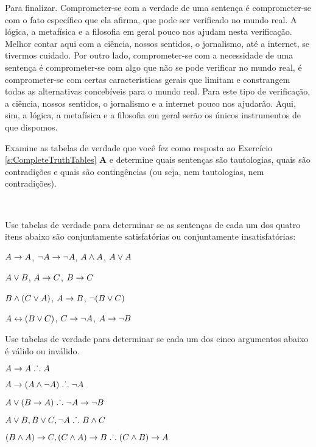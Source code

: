 Para finalizar.
Comprometer-se com a verdade de uma sentença é comprometer-se com o fato específico que ela afirma, que pode ser verificado no mundo real.
A lógica, a metafísica e a filosofia em geral pouco nos ajudam nesta verificação.
Melhor contar aqui com a ciência, nossos sentidos, o jornalismo, até a internet, se tivermos cuidado.
Por outro lado, comprometer-se com a necessidade de uma sentença é comprometer-se com algo que não se pode verificar no mundo real, é comprometer-se com certas características gerais que limitam e constrangem todas as alternativas concebíveis para o mundo real.
Para este tipo de verificação, a ciência, nossos sentidos, o jornalismo e a internet pouco nos ajudarão.
Aqui, sim, a lógica, a metafísica e a filosofia em geral serão os únicos instrumentos de que dispomos.


\practiceproblems
\problempart
Examine as tabelas de verdade que você fez como resposta ao Exercício \ref{s:CompleteTruthTables} \textbf{A} e determine quais sentenças são tautologias, quais são contradições e quais são contingências (ou seja, nem tautologias, nem contradições).
\solutions

\

\problempart
\label{pr.TT.satisfiable}
Use tabelas de verdade para determinar se as sentenças de cada um dos quatro itens abaixo são conjuntamente satisfatórias ou conjuntamente insatisfatórias:
\begin{earg}
\item $A\rightarrow A$, $\neg A \rightarrow \neg A$, $A\wedge A$, $A\vee A$ %
\item $A\vee B$, $A\rightarrow C$, $B\rightarrow C$ %
\item $B\wedge(C\vee A)$, $A\rightarrow B$, $\neg(B\vee C)$  %
\item $A\leftrightarrow(B\vee C)$, $C\rightarrow \neg A$, $A\rightarrow \neg B$ %
\end{earg}


\solutions
\problempart
\label{pr.TT.valid}
Use tabelas de verdade para determinar se cada um dos cinco argumentos abaixo é válido ou inválido.
\begin{earg}
\item $A\rightarrow A \mathrel{\ldotp\dot{}\,\ldotp} A$ %
\item $A\rightarrow(A\wedge\neg A) \mathrel{\ldotp\dot{}\,\ldotp} \neg A$ %
\item $A\vee(B\rightarrow A) \mathrel{\ldotp\dot{}\,\ldotp} \neg A \rightarrow \neg B$ %
\item $A\vee B, B\vee C, \neg A \mathrel{\ldotp\dot{}\,\ldotp} B \wedge C$ %
\item $(B\wedge A)\rightarrow C, (C\wedge A)\rightarrow B \mathrel{\ldotp\dot{}\,\ldotp} (C\wedge B)\rightarrow A$ %
\end{earg}

